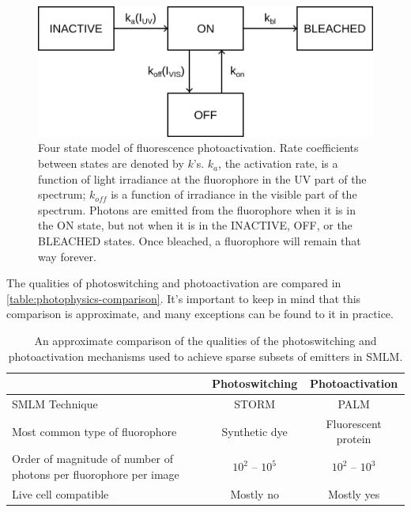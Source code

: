 \documentclass[10pt,a4paper,oneside]{book}
\begin{document}
\begin{figure}[ht]
    \centering
    \includegraphics{four-state-photoactivation-model.png}
    \caption{Four state model of fluorescence photoactivation. Rate coefficients between states are denoted by $k$'s. $k_a$, the activation rate, is a function of light irradiance at the fluorophore in the UV part of the spectrum; $k_{off}$ is a function of irradiance in the visible part of the spectrum. Photons are emitted from the fluorophore when it is in the ON state, but not when it is in the INACTIVE, OFF, or the BLEACHED states. Once bleached, a fluorophore will remain that way forever.}
    \label{fig:four-state-photoactivation}
\end{figure}

The qualities of photoswitching and photoactivation are compared in \autoref{table:photophysics-comparison}. It's important to keep in mind that this comparison is approximate, and many exceptions can be found to it in practice.

\begin{table}
    \centering
    \begin{tabular}{ |p{4cm}|c|c| } 
        \hline
        & Photoswitching & Photoactivation \\
        \hline 
        SMLM Technique & STORM & PALM \\
        \hline
        Most common type of fluorophore & Synthetic dye & Fluorescent protein \\
        \hline
        Order of magnitude of number of photons per fluorophore per image & $10^2$ -- $10^5$ & $10^2$ -- $10^3$ \\
        \hline
        Live cell compatible & Mostly no & Mostly yes \\
        \hline
    \end{tabular}
    \caption{An approximate comparison of the qualities of the photoswitching and photoactivation mechanisms used to achieve sparse subsets of emitters in SMLM.}
    \label{table:photophysics-comparison}
\end{table}
\end{document}
